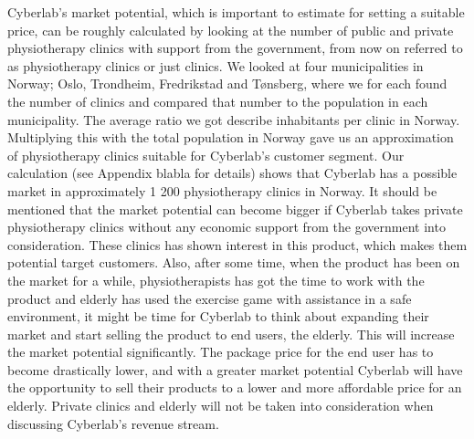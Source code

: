 Cyberlab’s market potential, which is important to estimate for setting a suitable price, can be roughly calculated by looking at the number of public and private physiotherapy clinics with support from the government, from now on referred to as physiotherapy clinics or just clinics. We looked at four municipalities in Norway; Oslo, Trondheim, Fredrikstad and T{ø}nsberg, where we for each found the number of clinics and compared that number to the population in each municipality. The average ratio we got describe inhabitants per clinic in Norway. Multiplying this with the total population in Norway gave us an approximation of physiotherapy clinics suitable for Cyberlab's customer segment. Our calculation (see Appendix blabla for details) shows that Cyberlab has a possible market in approximately 1 200 physiotherapy clinics in Norway. It should be mentioned that the market potential can become bigger if Cyberlab takes private physiotherapy clinics without any economic support from the government into consideration. These clinics has shown interest in this product, which makes them potential target customers. Also, after some time, when the product has been on the market for a while, physiotherapists has got the time to work with the product and elderly has used the exercise game with assistance in a safe environment, it might be time for Cyberlab to think about expanding their market and start selling the product to end users, the elderly. This will increase the market potential significantly. The package price for the end user has to become drastically lower, and with a greater market potential Cyberlab will have the opportunity to sell their products to a lower and more affordable price for an elderly. Private clinics and elderly will not be taken into consideration when discussing Cyberlab's revenue stream.\\ \\

